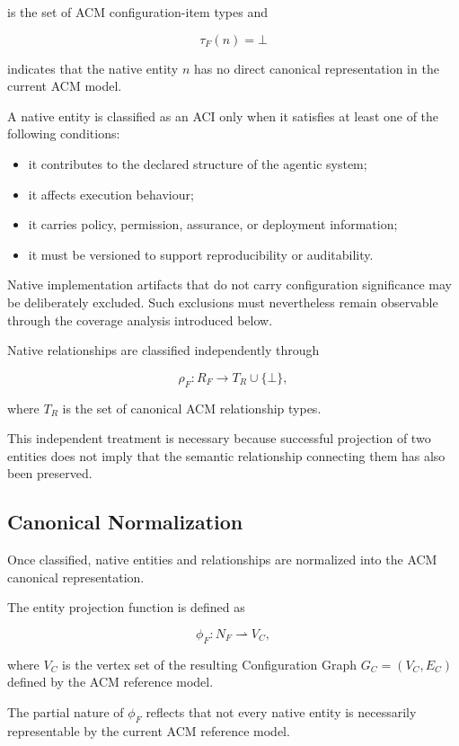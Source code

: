 \documentclass[10pt]{article}
\begin{document}
is the set of ACM configuration-item types and

\[
\tau_F(n)=\bot
\]

indicates that the native entity $n$ has no direct canonical representation in
the current ACM model.

A native entity is classified as an ACI only when it satisfies at least one of
the following conditions:

\begin{itemize}
	\item it contributes to the declared structure of the agentic system;
	\item it affects execution behaviour;
	\item it carries policy, permission, assurance, or deployment information;
	\item it must be versioned to support reproducibility or auditability.
\end{itemize}

Native implementation artifacts that do not carry configuration significance
may be deliberately excluded. Such exclusions must nevertheless remain
observable through the coverage analysis introduced below.

Native relationships are classified independently through

\[
\rho_F :
R_F
\rightarrow
T_R
\cup
\{\bot\},
\]

where $T_R$ is the set of canonical ACM relationship types.

This independent treatment is necessary because successful projection of two
entities does not imply that the semantic relationship connecting them has also
been preserved.

\subsection{Canonical Normalization}

Once classified, native entities and relationships are normalized into the ACM
canonical representation.

The entity projection function is defined as

\[
	\phi_F :
	N_F
	\rightharpoonup
	V_C,
\]

where $V_C$ is the vertex set of the resulting Configuration Graph
$G_C=(V_C,E_C)$ defined by the ACM reference model.

The partial nature of $\phi_F$ reflects that not every native entity is
necessarily representable by the current ACM reference model.
\end{document}
